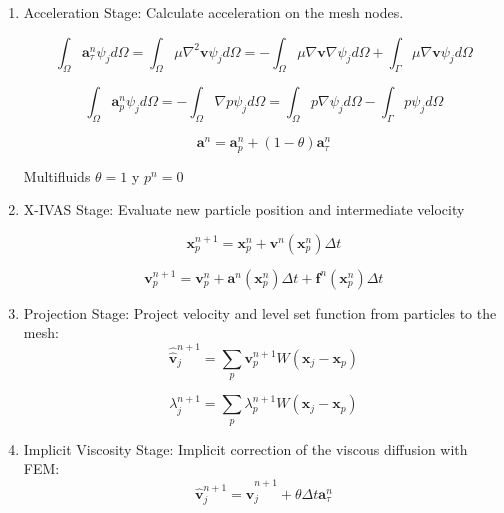 \documentclass[a4paper,conference]{IEEEtran}
\begin{document}
\begin{enumerate}
  \item Acceleration Stage: Calculate acceleration on the mesh nodes.


  \begin{equation}\label{Step1a}
\int_{\Omega}\mathbf{a}^{n}_{\tau}\psi_j d\Omega=\int_{\Omega}\mu \nabla^{2}\mathbf{v} \psi_j d\Omega=-\int_{\Omega}\mu \nabla\mathbf{v} \nabla \psi_j d\Omega + \int_{\Gamma}\mu \nabla\mathbf{v} \psi_j d\Omega
\end{equation}

\begin{equation}\label{Step1b}
\int_{\Omega}\mathbf{a}^{n}_{p}\psi_j d\Omega=-\int_{\Omega}\nabla p \psi_j d\Omega=\int_{\Omega} p \nabla \psi_j d\Omega - \int_{\Gamma} p \psi_j d\Omega
\end{equation}

\begin{equation}\label{Step1c}
\mathbf{a}^{n}=\mathbf{a}^{n}_{p} + (1-\theta)\mathbf{a}^{n}_{\tau}
\end{equation}

Multifluids $\theta=1$ y $p^n=0$

  \item X-IVAS Stage: Evaluate new particle position and intermediate velocity

  \begin{equation}\label{Step1b}
\mathbf{x}^{n+1}_{p}=\mathbf{x}^{n}_{p}+ \mathbf{v}^{n}(\mathbf{x}^{n}_{p}) \Delta t
\end{equation}

\begin{equation}\label{Step1c}
\mathbf{v}^{n+1}_{p}=\mathbf{v}^{n}_{p}+ \mathbf{a}^{n}(\mathbf{x}^{n}_{p}) \Delta t+\mathbf{f}^{n}(\mathbf{x}^{n}_{p})\Delta t
\end{equation}

  \item Projection Stage: Project velocity and level set function from particles to the mesh:
  \begin{equation}\label{Step1b}
\displaystyle \widehat{\widehat{\mathbf{v}}}^{n+1}_{j}=\sum_{p} \mathbf{v}^{n+1}_{p} W(\mathbf{x}_{j}-\mathbf{x}_{p})
\end{equation}

\begin{equation}\label{Step1b}
\displaystyle \lambda^{n+1}_{j}=\sum_{p} \lambda^{n+1}_{p} W(\mathbf{x}_{j}-\mathbf{x}_{p})
\end{equation}

  \item Implicit Viscosity Stage: Implicit correction of the viscous diffusion with FEM:
 \begin{equation}\label{Step1b}
\displaystyle \widehat{\mathbf{v}}^{n+1}_{j}=\widehat{\widehat{\mathbf{v}}}^{n+1}_{j} + \theta \Delta t \mathbf{a}^{n}_{\tau}
\end{equation}

\end{enumerate}
\end{document}
